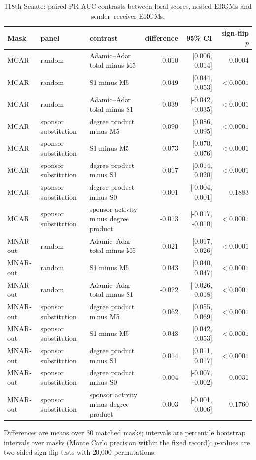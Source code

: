 \begin{table}[tbp]
\centering
\small
\caption{118th Senate: paired PR-AUC contrasts between local scores, nested ERGMs and sender--receiver ERGMs.}
\label{tab:senate-contrasts}
\begin{tabular}{lllrrr}
\toprule
Mask & panel & contrast & difference & 95\% CI & sign-flip $p$ \\
\midrule
MCAR & random & Adamic--Adar total minus M5 & 0.010 & [0.006, 0.014] & 0.0004 \\
MCAR & random & S1 minus M5 & 0.049 & [0.044, 0.053] & $<0.0001$ \\
MCAR & random & Adamic--Adar total minus S1 & -0.039 & [-0.042, -0.035] & $<0.0001$ \\
MCAR & sponsor substitution & degree product minus M5 & 0.090 & [0.086, 0.095] & $<0.0001$ \\
MCAR & sponsor substitution & S1 minus M5 & 0.073 & [0.070, 0.076] & $<0.0001$ \\
MCAR & sponsor substitution & degree product minus S1 & 0.017 & [0.014, 0.020] & $<0.0001$ \\
MCAR & sponsor substitution & degree product minus S0 & -0.001 & [-0.004, 0.001] & 0.1883 \\
MCAR & sponsor substitution & sponsor activity minus degree product & -0.013 & [-0.017, -0.010] & $<0.0001$ \\
MNAR-out & random & Adamic--Adar total minus M5 & 0.021 & [0.017, 0.026] & $<0.0001$ \\
MNAR-out & random & S1 minus M5 & 0.043 & [0.040, 0.047] & $<0.0001$ \\
MNAR-out & random & Adamic--Adar total minus S1 & -0.022 & [-0.026, -0.018] & $<0.0001$ \\
MNAR-out & sponsor substitution & degree product minus M5 & 0.062 & [0.055, 0.069] & $<0.0001$ \\
MNAR-out & sponsor substitution & S1 minus M5 & 0.048 & [0.042, 0.053] & $<0.0001$ \\
MNAR-out & sponsor substitution & degree product minus S1 & 0.014 & [0.011, 0.017] & $<0.0001$ \\
MNAR-out & sponsor substitution & degree product minus S0 & -0.004 & [-0.007, -0.002] & 0.0031 \\
MNAR-out & sponsor substitution & sponsor activity minus degree product & 0.003 & [-0.001, 0.006] & 0.1760 \\
\bottomrule
\end{tabular}
\par\vspace{2pt}\footnotesize Differences are means over 30 matched masks; intervals are percentile bootstrap intervals over masks (Monte Carlo precision within the fixed record); $p$-values are two-sided sign-flip tests with 20,000 permutations.
\end{table}